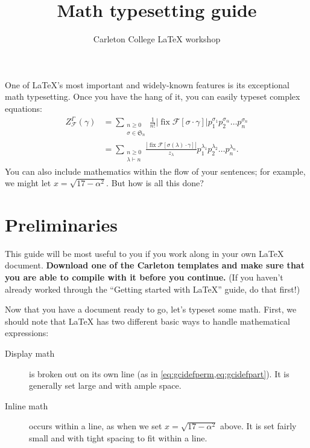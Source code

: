 \documentclass{article}
\title{Math typesetting guide}
\author{Carleton College \LaTeX{} workshop}
\date{}
\newcommand*{\inst}[1]{\textbf{#1}}
\begin{document}
\maketitle

One of \LaTeX{}'s most important and widely-known features is its exceptional math typesetting.
Once you have the hang of it, you can easily typeset complex equations:
\begin{subequations}
  \label{eq:gcidef}
  \begin{align}
    Z_{\mathcal{F}}^{\Gamma} (\gamma) &= \sum_{\substack{n \geq 0 \\ \sigma \in \mathfrak{S}_{n}}} \frac{1}{n!} \left\lvert \operatorname{fix} \mathcal{F} [\sigma \cdot \gamma] \right\rvert p_{1}^{\sigma_{1}} p_{2}^{\sigma_{@}} \dots p_{n}^{\sigma_{n}} \label{eq:gcidefperm} \\
    &= \sum_{\substack{n \geq 0 \\ \lambda \vdash n}} \frac{\left\lvert \operatorname{fix} \mathcal{F} [\sigma(\lambda) \cdot \gamma] \right\rvert}{z_{\lambda}} p_{1}^{\lambda_{1}} p_{2}^{\lambda_{2}} \dots p_{n}^{\lambda_{n}}. \label{eq:gcidefpart}
  \end{align}
\end{subequations}
You can also include mathematics within the flow of your sentences; for example, we might let $x = \sqrt{17 - \alpha^{2}}$.
But how is all this done?

\section{Preliminaries}
This guide will be most useful to you if you work along in your own \LaTeX{} document.
\inst{Download one of the Carleton templates and make sure that you are able to compile with it before you continue.}
(If you haven't already worked through the \enquote{Getting started with \LaTeX{}} guide, do that first!)

Now that you have a document ready to go, let's typeset some math.
First, we should note that \LaTeX{} has two different basic ways to handle mathematical expressions:
\begin{description}
\item[Display math]
  is broken out on its own line (as in \cref{eq:gcidefperm,eq:gcidefpart}).
  It is generally set large and with ample space.

\item[Inline math]
  occurs within a line, as when we set $x = \sqrt{17 - \alpha^{2}}$ above.
  It is set fairly small and with tight spacing to fit within a line.
\end{description}
\end{document}

